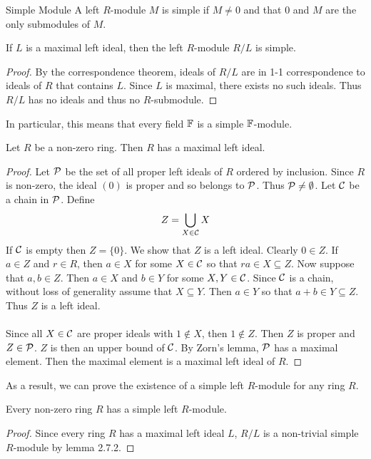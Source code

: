 \documentclass[a4paper]{article}
\begin{document}
\begin{defn}{Simple Module}{} A left $R$-module $M$ is simple if $M\neq 0$ and that $0$ and $M$ are the only submodules of $M$. 
\end{defn}

\begin{lmm}{}{} If $L$ is a maximal left ideal, then the left $R$-module $R/L$ is simple. \tcbline
\begin{proof}
By the correspondence theorem, ideals of $R/L$ are in 1-1 correspondence to ideals of $R$ that contains $L$. Since $L$ is maximal, there exists no such ideals. Thus $R/L$ has no ideals and thus no $R$-submodule. 
\end{proof}
\end{lmm}

In particular, this means that every field $\mathbb{F}$ is a simple $\mathbb{F}$-module. 

\begin{thm}{}{} Let $R$ be a non-zero ring. Then $R$ has a maximal left ideal. \tcbline
\begin{proof}
Let $\mathcal{P}$ be the set of all proper left ideals of $R$ ordered by inclusion. Since $R$ is non-zero, the ideal $(0)$ is proper and so belongs to $\mathcal{P}$. Thus $\mathcal{P}\neq\emptyset$. Let $\mathcal{C}$ be a chain in $\mathcal{P}$. Define $$Z=\bigcup_{X\in\mathcal{C}}X$$ If $\mathcal{C}$ is empty then $Z=\{0\}$. We show that $Z$ is a left ideal. Clearly $0\in Z$. If $a\in Z$ and $r\in R$, then $a\in X$ for some $X\in\mathcal{C}$ so that $ra\in X\subseteq Z$. Now suppose that $a,b\in Z$. Then $a\in X$ and $b\in Y$ for some $X,Y\in\mathcal{C}$. Since $\mathcal{C}$ is a chain, without loss of generality assume that $X\subseteq Y$. Then $a\in Y$ so that $a+b\in Y\subseteq Z$. Thus $Z$ is a left ideal. \\~\\

Since all $X\in\mathcal{C}$ are proper ideals with $1\notin X$, then $1\notin Z$. Then $Z$ is proper and $Z\in\mathcal{P}$. $Z$ is then an upper bound of $\mathcal{C}$. By Zorn's lemma, $\mathcal{P}$ has a maximal element. Then the maximal element is a maximal left ideal of $R$. 
\end{proof}
\end{thm}

As a result, we can prove the existence of a simple left $R$-module for any ring $R$. 

\begin{crl}{}{} Every non-zero ring $R$ has a simple left $R$-module. \tcbline
\begin{proof}
Since every ring $R$ has a maximal left ideal $L$, $R/L$ is a non-trivial simple $R$-module by lemma 2.7.2. 
\end{proof}
\end{crl}
\end{document}
